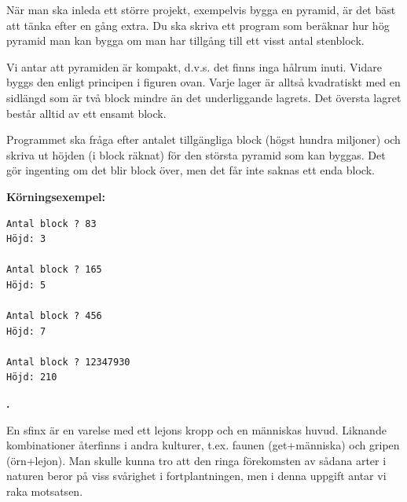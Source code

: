 \documentclass[a4paper,12pt]{article}
\newcounter{iii}\setcounter{iii}{0}
\def\i{\bigskip\noindent\refstepcounter{iii}\textbf{\arabic{iii}.} }
\begin{document}
När man ska inleda ett större projekt, exempelvis bygga en pyramid, är det bäst att tänka efter en gång extra. Du ska skriva ett program som beräknar hur hög pyramid man kan bygga om man har tillgång till ett visst antal stenblock.

Vi antar att pyramiden är kompakt, d.v.s. det finns inga hålrum inuti. Vidare byggs den enligt principen i figuren ovan. Varje lager är alltså kvadratiskt med en sidlängd som är två block mindre än det underliggande lagrets. Det översta lagret består alltid av ett ensamt block.

Programmet ska fråga efter antalet tillgängliga block (högst hundra miljoner) och skriva ut höjden (i block räknat) för den största pyramid som kan byggas. Det gör ingenting om det blir block över, men det får inte saknas ett enda block.

\textbf{Körningsexempel:}
\begin{lstlisting}
Antal block ? 83  
Höjd: 3 

Antal block ? 165
Höjd: 5

Antal block ? 456  
Höjd: 7 

Antal block ? 12347930 
Höjd: 210
\end{lstlisting}

\pagebreak

\i 

En sfinx är en varelse med ett lejons kropp och en människas huvud. Liknande kombinationer återfinns i andra kulturer, t.ex. faunen (get+människa) och gripen (örn+lejon). Man skulle kunna tro att den ringa förekomsten av sådana arter i naturen beror på viss svårighet i fortplantningen, men i denna uppgift antar vi raka motsatsen.
\end{document}
